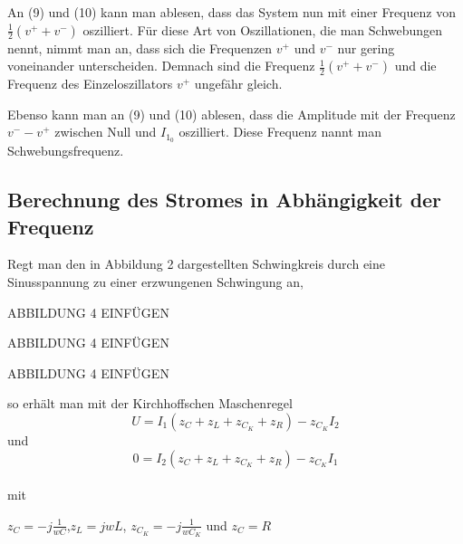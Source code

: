 An (9) und (10) kann man ablesen, dass das System nun mit einer Frequenz von $ \frac{1}{2} (v^{+} + v^{-}) $ oszilliert. Für diese Art von Oszillationen, die man Schwebungen nennt,
nimmt man an, dass sich die Frequenzen $ v^{+} $ und $ v^{-} $ nur gering voneinander unterscheiden. Demnach sind die Frequenz $ \frac{1}{2} (v^{+} + v^{-}) $ und
die Frequenz des Einzeloszillators $ v^{+} $ ungefähr gleich.

Ebenso kann man an (9) und (10) ablesen, dass die Amplitude mit der Frequenz $ v^{-} - v^{+} $ zwischen Null und $ I_{1_0} $ oszilliert. Diese Frequenz nannt man Schwebungsfrequenz.
\\
\subsection{Berechnung des Stromes in Abhängigkeit der Frequenz}
Regt man den in Abbildung 2 dargestellten Schwingkreis durch eine Sinusspannung zu einer erzwungenen Schwingung an,

ABBILDUNG 4 EINFÜGEN

ABBILDUNG 4 EINFÜGEN

ABBILDUNG 4 EINFÜGEN


so erhält man mit der Kirchhoffschen Maschenregel
\begin{equation}
    U = I_1 (z_C + z_L + z_{C_K} + z_R) - z_{C_K} I_2
    \label{eqn:Elf}
\end{equation}
und
\begin{equation}
    0 = I_2 (z_C + z_L + z_{C_K} + z_R) - z_{C_K} I_1
    \label{eqn:Zwoelf}
\end{equation}
\\
mit \begin{CenterStrip} 
        $z_C = -j \frac{1}{wC}$,$z_L = jwL$,   $z_{C_K} = -j \frac{1}{wC_K}$  und  $z_C = R$
    \end{CenterStrip}
\\

